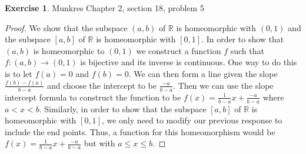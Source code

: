 \documentclass[12pt]{article}
\theoremstyle{definition}
\newtheorem{exercise}{Exercise}
\begin{document}
\begin{exercise} Munkres Chapter 2, section 18, problem 5
\begin{proof}
	We show that the subspace $(a,b)$ of $\mathbb{R}$ is homeomorphic with $(0,1)$ and the subspace $[a,b]$ of $\mathbb{R}$ is homeomorphic with $[0,1]$. In order to show that $(a,b)$ is homeomorphic to $(0,1)$ we construct a function $f$ such that $f:(a,b)\to (0,1)$ is bijective and its inverse is continuous. One way to do this is to let $f(a)=0$ and $f(b)=0$. We can then form a line given the slope $\frac{f(b)-f(a)}{b-a}$ and choose the intercept to be $\frac{-a}{b-a}$. Then we can use the slope intercept formula to construct the function to be $f(x)=\frac{1}{b-a}x+\frac{-a}{b-a}$ where $a<x<b$. Similarly, in order to show that the subspace $[a,b]$ of $\mathbb{R}$ is homeomorphic with $[0,1]$, we only need to modify our previous response to include the end points. Thus, a function for this homeomorphism would be $f(x)=\frac{1}{b-a}x+\frac{-a}{b-a}$ but with $a\leq x\leq b$.
\end{proof}
\end{exercise}
\end{document}
